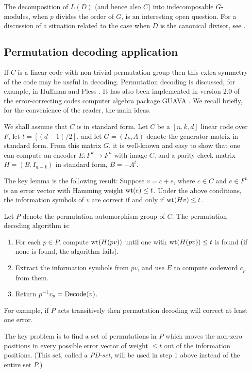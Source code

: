 \documentclass[12pt]{article}
\numberwithin{equation}{section}
\def\wt{{\rm{wt}}}
\begin{document}
The decomposition of $L(D)$ (and hence also $C$) into
indecomposable $G$-modules, when $p$ divides the order
of $G$, is an interesting open question.
For a discussion of a situation
related to the case when $D$ is the canonical divisor, 
see \cite{S}.
 
\subsection{Permutation decoding application}

If $C$ is a linear code with non-trivial permutation group
then this extra symmetry of the code may be useful in 
decoding.
Permutation decoding is discussed, for example, in 
Huffman and Pless \cite{HP}. It has also been implemented
in version 2.0 of the error-correcting codes computer
algebra package GUAVA \cite{GUAVA}. We recall briefly, for the
convenience of the reader, the main ideas.

We shall assume that $C$ is in standard form.
Let $C$ be a $[n,k,d]$ linear code over $F$,
let $t=[(d-1)/2]$, and let $G=(I_k,A)$ denote the generator matrix
in standard form. From this matrix $G$, it is well-known and easy to
show that one can compute
an encoder $E:F^k\rightarrow F^n$ with
image $C$, and a parity check matrix $H=(B,I_{n-k})$ 
in standard form, $B=-A^t$.

The key lemma is the following result: 
Suppose $v=c+e$, where $c\in C$ and $e\in F^n$
is an error vector with Hamming weight $\wt (e)\leq t$. 
Under the above conditions,
the information symbols of $v$ are correct if and only if 
$\wt (Hv)\leq t$. 

Let $P$ denote the permutation automorphism group of $C$. 
The permutation decoding algorithm is:

\begin{enumerate}
\item
For each $p\in P$, compute $\wt (H(pv))$ until one with
$\wt (H(pv))\leq t$ is found (if none is found, the 
algorithm fails).

\item
Extract the information symbols from $pv$,
and use $E$ to compute codeword $c_p$ from them.

\item
Return $p^{-1}c_p={\rm Decode}(v)$. 
\end{enumerate}
For example, if $P$ acts transitively then 
permutation decoding will correct at least one error. 

The key problem is 
to find a set of permutations in $P$ which moves 
the non-zero positions in every possible error vector
of weight $\leq t$ out of the information positions.
(This set, called a {\it PD-set}, will be used in step
1 above instead of the entire set $P$.)
\end{document}
